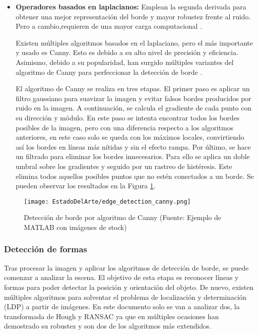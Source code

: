 \begin{itemize}
\item \textbf{Operadores basados en laplacianos:} Emplean la segunda derivada para obtener una mejor representación del borde y mayor robustez frente al ruido. Pero a cambio,requieren de una mayor carga computacional \cite{edgecomp}.

Existen múltiples algoritmos basados en el laplaciano, pero el más importante y usado es Canny. Esto es debido a su alto nivel de precisión y eficiencia. Asimismo, debido a su popularidad, han surgido múltiples variantes del algoritmo de Canny para perfeccionar la detección de borde \cite{TFGAna}.

El algoritmo de Canny se realiza en tres etapas. El primer paso es aplicar un filtro gaussiano para suavizar la imagen y evitar falsos bordes producidos por ruido en la imagen. A continuación, se calcula el gradiente de cada punto con su dirección y módulo. En este paso se intenta encontrar todos los bordes posibles de la imagen, pero con una diferencia respecto a los algoritmos anteriores, en este caso solo se queda con los máximos locales, convirtiendo así los bordes en líneas más nítidas y sin el efecto rampa. Por último, se hace un filtrado para eliminar los bordes innecesarios. Para ello se aplica un doble umbral sobre los gradientes y seguido por un rastreo de histéresis. Este elimina todos aquellos posibles puntos que no estén conectados a un borde. Se pueden observar los resultados en la Figura \ref{fig:EDGE2}.
\end{itemize}

\begin{figure}[ht]
	\centering
	\texttt{[image: EstadoDelArte/edge\_detection\_canny.png]}
	\caption[Detección de borde por algoritmo de Canny]{Detección de borde por algoritmo de Canny (Fuente: Ejemplo de MATLAB con imágenes de stock)}
	\label{fig:EDGE2}
	\vspace{-5pt}
\end{figure}
	
\subsubsection*{Detección de formas}
Tras procesar la imagen y aplicar los algoritmos de detección de borde, se puede comenzar a analizar la escena. El objetivo de esta etapa es reconocer líneas y formas para poder detectar la posición y orientación del objeto. De nuevo, existen múltiples algoritmos para solventar el problema de localización y determinación (LDP) a partir de imágenes. En este documento solo se van a analizar dos, la transformada de Hough y RANSAC ya que en múltiples ocasiones han demostrado su robustez y son dos de los algoritmos más extendidos.

